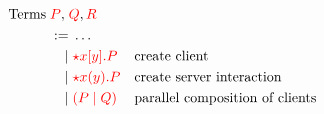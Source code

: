 \[\!
  \begin{aligned}
    \text{Terms} \; \textcolor{red}{P}, \; &\textcolor{red}{Q}, \textcolor{red}{R}
    \\   :=& \; \dots
    \\ \mid& \; \textcolor{red}{{\star}{x}[y].P} &&\text{create client}
    \\ \mid& \; \textcolor{red}{{\star}{x}(y).P} &&\text{create server interaction}
    \\ \mid& \; \textcolor{red}{(P \mid Q)}   &&\text{parallel composition of clients}
  \end{aligned}
\]
